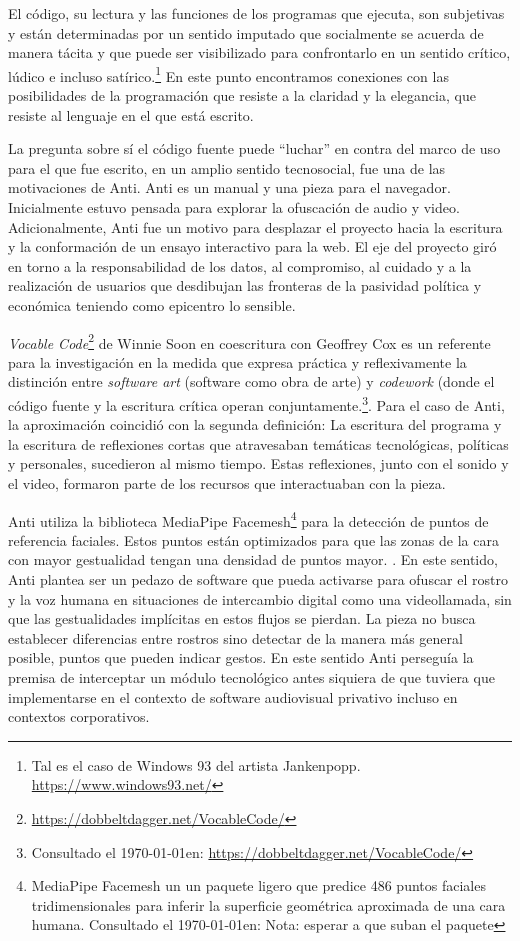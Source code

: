 \documentclass[12pt,letterpaper, twoside, openright,
headinclude,footinclude,BCOR5mm,
numbers=noenddot,cleardoublepage=empty,
tablecaptionabove]{article}
\begin{document}

El código, su lectura y las funciones de los programas que ejecuta, son subjetivas y están determinadas por un sentido imputado que socialmente se acuerda de manera tácita y que puede ser visibilizado para confrontarlo en un sentido crítico, lúdico e incluso satírico.\footnote{Tal es el caso de Windows 93 del artista Jankenpopp. \url{https://www.windows93.net/} } En este punto encontramos conexiones con las posibilidades de la programación que resiste a la claridad y la elegancia, que resiste al lenguaje en el que está escrito\citep[p.~198]{obfuscatedCode}.


La pregunta sobre sí el código fuente puede ``luchar'' en contra del marco de uso para el que fue escrito, en un amplio sentido tecnosocial, fue una de las motivaciones de Anti. Anti es un manual y una pieza para el navegador. Inicialmente estuvo pensada para explorar la ofuscación de audio y video. Adicionalmente, Anti fue un motivo para desplazar el proyecto hacia la escritura y la conformación de un ensayo interactivo para la web. El eje del proyecto giró en torno a la responsabilidad de los datos, al compromiso, al cuidado y a la realización de usuarios que desdibujan las fronteras de la pasividad política y económica teniendo como epicentro lo sensible.

\emph{Vocable Code}\footnote{\url{https://dobbeltdagger.net/VocableCode/}} de Winnie Soon en coescritura con Geoffrey Cox es un referente para la investigación en la medida que expresa práctica y reflexivamente la distinción entre \emph{software art} (software como obra de arte) y \emph{codework} (donde el código fuente y la escritura crítica operan conjuntamente.\footnote{Consultado el \today en: \url{https://dobbeltdagger.net/VocableCode/}}. Para el caso de Anti, la aproximación coincidió con la segunda definición: La escritura del programa y la escritura de reflexiones cortas que atravesaban temáticas tecnológicas, políticas y personales, sucedieron al mismo tiempo. Estas reflexiones, junto con el sonido y el video, formaron parte de los recursos que interactuaban con la pieza.

Anti utiliza la biblioteca MediaPipe Facemesh\footnote{MediaPipe Facemesh un un paquete ligero que predice 486 puntos faciales tridimensionales para inferir la superficie geométrica aproximada de una cara humana. Consultado el \today en: Nota: esperar a que suban el paquete} para la detección de puntos de referencia faciales. Estos puntos están optimizados para que las zonas de la cara con mayor gestualidad tengan una densidad de puntos mayor. \citep{kartynnik2019realtime}. En este sentido, Anti plantea ser un pedazo de software que pueda activarse para ofuscar el rostro y la voz humana en situaciones de intercambio digital como una videollamada, sin que las gestualidades implícitas en estos flujos se pierdan. La pieza no busca establecer diferencias entre rostros sino detectar de la manera más general posible, puntos que pueden indicar gestos. En este sentido Anti perseguía la premisa de interceptar un módulo tecnológico antes siquiera de que tuviera que implementarse en el contexto de software audiovisual privativo incluso en contextos corporativos.
\end{document}
